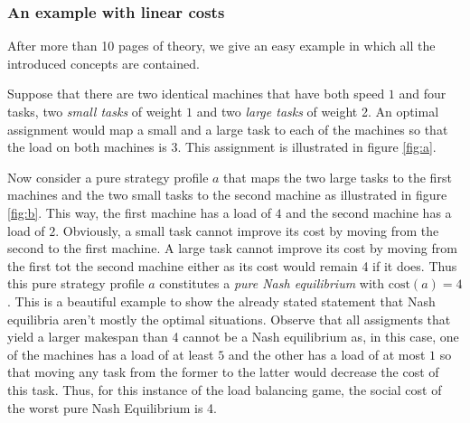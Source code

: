 \documentclass[a4paper,11pt]{article}
\newcommand{\cost}{\text{cost}}
\begin{document}
\subsubsection{An example with linear costs}
After more than 10 pages of theory, we give an easy example in which all the introduced concepts are contained.

Suppose that there are two identical machines that have both speed $1$ and four tasks, two \emph{small tasks} of weight $1$ and two \emph{large tasks} of weight 2. An optimal assignment would map a small and a large task to each of the machines so that the load on both machines is $3$. This assignment is illustrated in figure \ref{fig:a}.

Now consider a pure strategy profile $a$ that maps the two large tasks to the first machines and the two small tasks to the second machine as illustrated in figure \ref{fig:b}. This way, the first machine has a load of $4$ and the second machine has a load of $2$. Obviously, a small task cannot improve its cost by moving from the second to the first machine. A large task cannot improve its cost by moving from the first tot the second machine either as its cost would remain 4 if it does. Thus this pure strategy profile $a$ constitutes a \emph{pure Nash equilibrium} with $\cost(a)=4$. This is a beautiful example to show the already stated statement that Nash equilibria aren't mostly the optimal situations. Observe that all assigments that yield a larger makespan than 4 cannot be a Nash equilibrium as, in this case, one of the machines has a load of at least $5$ and the other has a load of at most $1$ so that moving any task from the former to the latter would decrease the cost of this task. Thus, for this instance of the load balancing game, the social cost of the worst pure Nash Equilibrium is 4.
\end{document}
